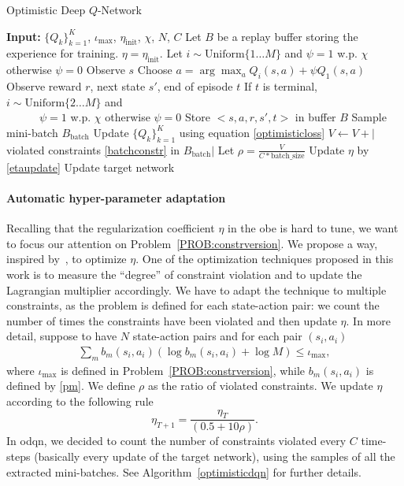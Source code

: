 \begin{algorithm}[t]
	\caption{Optimistic Deep $Q$-Network}
	\label{optimisticdqn}
	\begin{algorithmic}
		\STATE \textbf{Input:} $\{Q_k\}_{k=1}^K$, $\iota_{\max}$, $\eta_{\mathrm{init}}$, $\chi$, $N$, $C$
		\STATE Let $B$ be a replay buffer storing the experience for training.
		\STATE $\eta = \eta_{\mathrm{init}}$.
		\STATE Let $i \sim \mathrm{Uniform}\{1 \dots M\}$ and $\psi = 1$ w.p. $\chi$ otherwise $\psi = 0$
		\STATE Observe $s$
		\STATE Choose $a = \arg \max_a Q_i(s,a) + \psi Q_1(s,a)$
		\STATE Observe reward $r$, next state $s'$, end of episode $t$
		\STATE If $t$ is terminal, $i \sim \mathrm{Uniform}\{2 \dots M\}$ and \\ \ \ \ \ \ \ $\psi = 1$ w.p. $\chi$ otherwise $\psi=0$
		\STATE Store $<s,a,r,s',t>$ in buffer $B$
		\STATE Sample mini-batch $B_{\mathrm{batch}}$
		\STATE Update $\{Q_k\}_{k=1}^K$ using equation \eqref{optimisticloss}
		\STATE $V \leftarrow V + |$ violated constraints \eqref{batchconstr} in $B_{\mathrm{batch}}|$ 
		\ENDFOR
		\STATE Let $\rho = \frac{V}{C * \mathrm{batch\_size}}$
		\STATE Update $\eta$ by \eqref{etaupdate}
		\STATE Update target network
		\ENDFOR
	\end{algorithmic}
\end{algorithm}

\paragraph{Automatic hyper-parameter adaptation}
\label{subsec:adaptive}
Recalling that the regularization coefficient $\eta$ in the \gls{obe} is hard to tune, we want to focus our attention on Problem~\ref{PROB:constrversion}. We propose a way, inspired by~\cite{schulman2017proximal}, to optimize $\eta$.
One of the optimization techniques proposed in this work is to measure the ``degree'' of constraint violation and to update the Lagrangian multiplier accordingly. We have to adapt the technique to multiple constraints, as the problem is defined for each state-action pair: we count the number of times the constraints have been violated and then update $\eta$. In more detail, suppose to have $N$ state-action pairs and for each pair $(s_i, a_i)$
\begin{eqnarray}
\sum_m b_m(s_i,a_i) (\log b_m(s_i,a_i) + \log M) \leq \iota_{\max}, \label{batchconstr}
\end{eqnarray}
where $\iota_{\max}$ is defined in Problem~\ref{PROB:constrversion}, while $b_m(s_i,a_i)$ is defined by \eqref{pm}. We define $\rho$ as the ratio of violated constraints. We update $\eta$ according to the following rule
\begin{equation}
\eta_{T+1} = \frac{\eta_{T}}{(0.5 +  10 \rho)} \label{etaupdate}.
\end{equation}
In \gls{odqn}, we decided to count the number of constraints violated every $C$ time-steps (basically every update of the target network), using the samples of all the extracted mini-batches. See Algorithm~\ref{optimisticdqn} for further details. 
  
